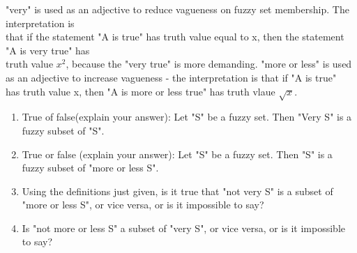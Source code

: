 \documentclass{article}
\begin{document}
\noindent "very" is used as an adjective to reduce vagueness on fuzzy set membership. The interpretation is \\ that if the statement "A is true" has truth value equal to x, then the statement 
"A is very true" has \\ truth value $x^2$, because the "very true" is more demanding. \newline "more or less" is used as an adjective to increase vagueness - the interpretation is that if
"A is true" \\ has truth value x, then "A is more or less true" has truth vlaue $\sqrt{x}$.
\begin{enumerate}
  \item True of false(explain your answer): Let "S" be a fuzzy set. Then "Very S" is a fuzzy subset of "S".
  \item True or false (explain your answer): Let "S" be a fuzzy set. Then "S" is a fuzzy subset of "more or less S".
  \item Using the definitions just given, is it true that "not very S" is a subset of "more or less S", or vice versa, or is it impossible to say?
  \item Is "not more or less S" a subset of "very S", or vice versa, or is it impossible to say? \\ \\
\end{enumerate}
\end{document}
